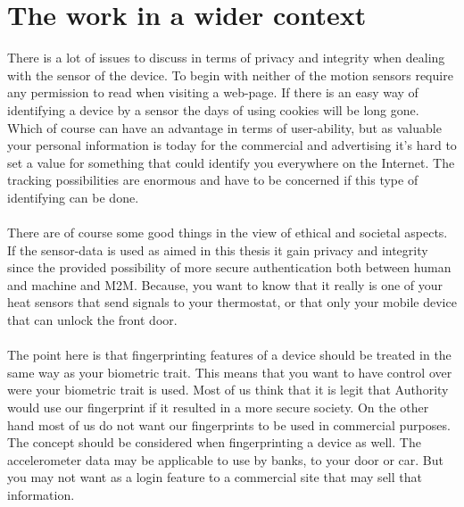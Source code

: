 \section{The work in a wider context}\label{sec:ethical}
There is a lot of issues to discuss in terms of privacy and integrity when dealing with the sensor of the device. To begin with neither of the motion sensors require any permission to read when visiting a web-page. If there is an easy way of identifying a device by a sensor the days of using cookies will be long gone. Which of course can have an advantage in terms of user-ability, but as valuable your personal information is today for the commercial and advertising it’s hard to set a value for something that could identify you everywhere on the Internet. The tracking possibilities are enormous and have to be concerned if this type of identifying can be done. \\
\\
There are of course some good things in the view of ethical and societal aspects. If the sensor-data is used as aimed in this thesis it gain privacy and integrity since the provided possibility of more secure authentication both between human and machine and M2M. Because, you want to know that it really is one of your heat sensors that send signals to your thermostat, or that only your mobile device that can unlock the front door.\\
\\
The point here is that fingerprinting features of a device should be treated in the same way as your biometric trait. This means that you want to have control over were your biometric trait is used. Most of us think that it is legit that Authority would use our fingerprint if it resulted in a more secure society. On the other hand most of us do not want our fingerprints to be used in commercial purposes. \\
The concept should be considered when fingerprinting a device as well. The accelerometer data may be applicable to use by banks, to your door or car. But you may not want as a login feature to a commercial site that may sell that information.